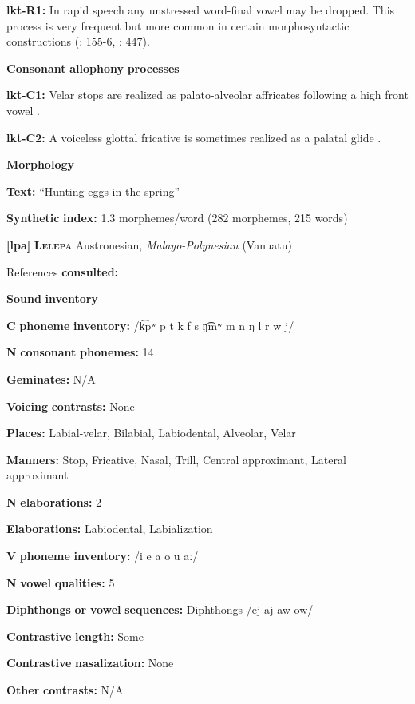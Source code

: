 \textbf{lkt-R1:} In rapid speech any unstressed word-final vowel may be dropped. This process is very frequent but more common in certain morphosyntactic constructions (\citealt{Mirzayan2010}: 155-6, \citealt{RoodTaylor1996}: 447).

\textbf{Consonant} \textbf{allophony} \textbf{processes}

\textbf{lkt-C1:} Velar stops are realized as palato-alveolar affricates following a high front vowel \citep[6]{Ingham2003}.

\textbf{lkt-C2:} A voiceless glottal fricative is sometimes realized as a palatal glide \citep{Ingham2003}.

\textbf{Morphology}

\textbf{Text:} “Hunting eggs in the spring” \citep[95-96]{Ingham2003}

\textbf{Synthetic} \textbf{index:} 1.3 morphemes/word (282 morphemes, 215 words)

\textbf{[lpa]}   \textbf{\textsc{Lelepa}}  Austronesian, \textit{Malayo-Polynesian} (Vanuatu)

References \textbf{consulted:} \citet{Lacrampe2014}

\textbf{Sound} \textbf{inventory}

\textbf{C} \textbf{phoneme} \textbf{inventory:} /k͡pʷ p t k f s ŋ͡mʷ m n ŋ l r w j/

\textbf{N} \textbf{consonant} \textbf{phonemes:} 14

\textbf{Geminates:} N/A

\textbf{Voicing} \textbf{contrasts:} None

\textbf{Places:} Labial-velar, Bilabial, Labiodental, Alveolar, Velar

\textbf{Manners:} Stop, Fricative, Nasal, Trill, Central approximant, Lateral approximant

\textbf{N} \textbf{elaborations:} 2

\textbf{Elaborations:} Labiodental, Labialization

\textbf{V} \textbf{phoneme} \textbf{inventory:} /i e a o u aː/

\textbf{N} \textbf{vowel} \textbf{qualities:} 5

\textbf{Diphthongs} \textbf{or} \textbf{vowel} \textbf{sequences:} Diphthongs /ej aj aw ow/

\textbf{Contrastive} \textbf{length:} Some

\textbf{Contrastive} \textbf{nasalization:} None

\textbf{Other} \textbf{contrasts:} N/A

